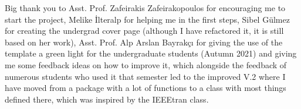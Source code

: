 Big thank you to Asst. Prof. Zafeirakis Zafeirakopoulos for encouraging me to start the project, Melike İlteralp for helping me in the first steps, Sibel Gülmez for creating the undergrad cover page (although I have refactored it, it is still based on her work), Asst. Prof. Alp Arslan Bayrakçı for giving the use of the template a green light for the undergraduate students (Autumn 2021) and giving me some feedback ideas on how to improve it, which alongside the feedback of numerous students who used it that semester led to the improved V.2 where I have moved from a package with a lot of functions to a class with most things defined there, which was inspired by the IEEEtran class.

\clearpage